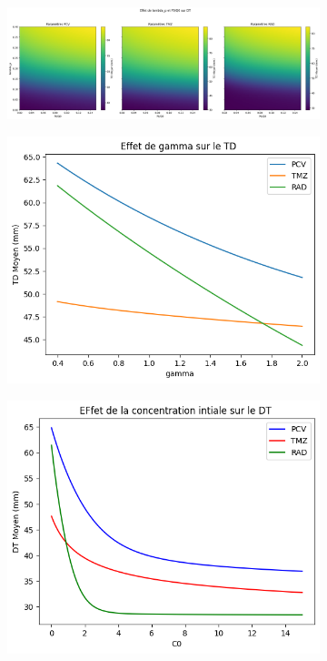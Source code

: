 \documentclass[12pt,a4paper]{article}
\begin{document}
\begin{figure}
    
    \begin{subfigure}[t]{\textwidth}
    \centering
        \includegraphics[width=\linewidth]{Image/heatmap_lambdap_p0Q0.png} 
        \caption{} \label{fig:heatmap}
    \end{subfigure}
    \vspace{1cm}
    \centering
    \begin{subfigure}[t]{0.45\textwidth}
        \centering
        \includegraphics[width=\linewidth]{Image/effet_gamma.png} 
        \caption{} \label{fig:effet_gamma}
    \end{subfigure}
    \hfill
    \begin{subfigure}[t]{0.45\textwidth}
        \centering
        \includegraphics[width=\linewidth]{Image/effet_C.png} 

\end{subfigure}
\end{figure}
\end{document}
